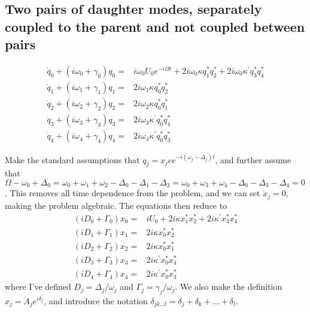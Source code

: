 \subsection*{Two pairs of daughter modes, separately coupled to the parent and not coupled between pairs}

\begin{subequations}
\begin{align}
\dot{q}_0 + (i\omega_0 + \gamma_0)q_0 = & i\omega_0 U_0 e^{-i\Omega t} + 2i\omega_0 \kappa q_1^\ast q_2^\ast + 2i\omega_0 \kappa^\prime q_3^\ast q_4^\ast \\
\dot{q}_1 + (i\omega_1 + \gamma_1)q_1 = & 2i\omega_1 \kappa q_0^\ast q_2^\ast \\
\dot{q}_2 + (i\omega_2 + \gamma_2)q_2 = & 2i\omega_2 \kappa q_0^\ast q_1^\ast \\
\dot{q}_3 + (i\omega_3 + \gamma_3)q_3 = & 2i\omega_3 \kappa^\prime q_0^\ast q_4^\ast \\
\dot{q}_4 + (i\omega_4 + \gamma_4)q_4 = & 2i\omega_4 \kappa^\prime q_0^\ast q_3^\ast
\end{align}
\end{subequations}

Make the standard assumptions that $q_j = x_je e^{-i(\omega_j - \Delta_j)t}$, and further assume that $\Omega - \omega_0 + \Delta_0 = \omega_0 + \omega_1 + \omega_2 - \Delta_0 - \Delta_1 - \Delta_2 = \omega_0 + \omega_3 + \omega_4 - \Delta_0 - \Delta_3 - \Delta_4 = 0$. This removes all time dependence from the problem, and we can set $\dot{x}_j=0$, making the problem algebraic. The equations then reduce to
\begin{subequations}
\begin{align}
(i D_0 + \Gamma_0) x_0 = & i U_0 + 2i \kappa x_1^\ast x_2^\ast + 2i \kappa^\prime x_3^\ast x_4^\ast \\
(i D_1 + \Gamma_1) x_1 = & 2i \kappa x_0^\ast x_2^\ast \\
(i D_2 + \Gamma_2) x_2 = & 2i \kappa x_0^\ast x_1^\ast \\
(i D_3 + \Gamma_3) x_3 = & 2i \kappa^\prime x_0^\ast x_4^\ast \\
(i D_4 + \Gamma_4) x_4 = & 2i \kappa^\prime x_0^\ast x_3^\ast
\end{align}
\end{subequations}
where I've defined $D_j = \Delta_j / \omega_j$ and $\Gamma_j = \gamma_j /\omega_j$. We also make the definition $x_j = A_j e^{i\delta_j}$, and introduce the notation $\delta_{jk...l} = \delta_j + \delta_k + ... + \delta_l$.

